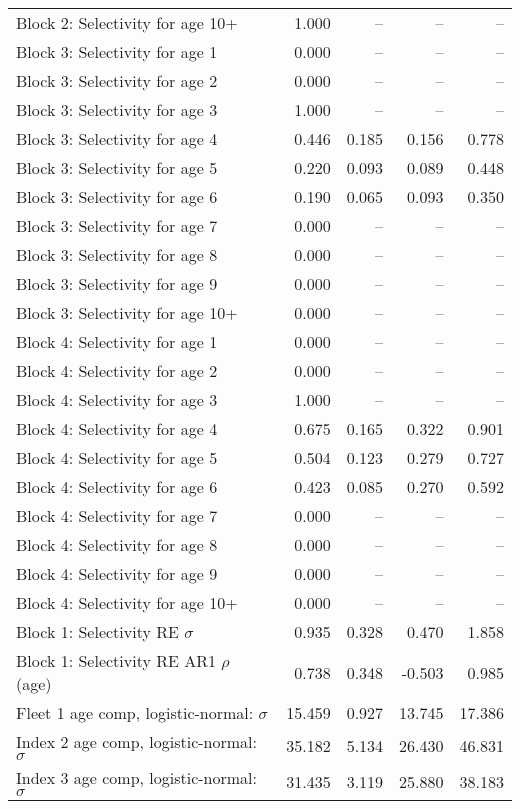 \documentclass[
]{article}
\begin{document}
\begin{landscape}
\begin{longtable}[t]{lrrrr}
Block 2: Selectivity for age 10+ & 1.000 & -- & -- & --\\
Block 3: Selectivity for age 1 & 0.000 & -- & -- & --\\
Block 3: Selectivity for age 2 & 0.000 & -- & -- & --\\
Block 3: Selectivity for age 3 & 1.000 & -- & -- & --\\
\addlinespace
Block 3: Selectivity for age 4 & 0.446 & 0.185 & 0.156 & 0.778\\
Block 3: Selectivity for age 5 & 0.220 & 0.093 & 0.089 & 0.448\\
Block 3: Selectivity for age 6 & 0.190 & 0.065 & 0.093 & 0.350\\
Block 3: Selectivity for age 7 & 0.000 & -- & -- & --\\
Block 3: Selectivity for age 8 & 0.000 & -- & -- & --\\
\addlinespace
Block 3: Selectivity for age 9 & 0.000 & -- & -- & --\\
Block 3: Selectivity for age 10+ & 0.000 & -- & -- & --\\
Block 4: Selectivity for age 1 & 0.000 & -- & -- & --\\
Block 4: Selectivity for age 2 & 0.000 & -- & -- & --\\
Block 4: Selectivity for age 3 & 1.000 & -- & -- & --\\
\addlinespace
Block 4: Selectivity for age 4 & 0.675 & 0.165 & 0.322 & 0.901\\
Block 4: Selectivity for age 5 & 0.504 & 0.123 & 0.279 & 0.727\\
Block 4: Selectivity for age 6 & 0.423 & 0.085 & 0.270 & 0.592\\
Block 4: Selectivity for age 7 & 0.000 & -- & -- & --\\
Block 4: Selectivity for age 8 & 0.000 & -- & -- & --\\
\addlinespace
Block 4: Selectivity for age 9 & 0.000 & -- & -- & --\\
Block 4: Selectivity for age 10+ & 0.000 & -- & -- & --\\
Block 1: Selectivity RE $\sigma$ & 0.935 & 0.328 & 0.470 & 1.858\\
Block 1: Selectivity RE AR1 $\rho$ (age) & 0.738 & 0.348 & -0.503 & 0.985\\
Fleet 1 age comp, logistic-normal: $\sigma$ & 15.459 & 0.927 & 13.745 & 17.386\\
\addlinespace
Index 2 age comp, logistic-normal: $\sigma$ & 35.182 & 5.134 & 26.430 & 46.831\\
Index 3 age comp, logistic-normal: $\sigma$ & 31.435 & 3.119 & 25.880 & 38.183\\*
\end{longtable}
\end{landscape}
\end{document}
